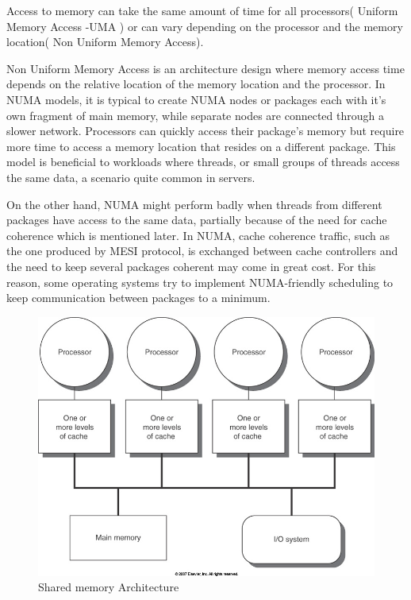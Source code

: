Access to memory can take the same amount of time for all processors( Uniform Memory Access -UMA ) or can vary depending on the processor and the memory location( Non Uniform Memory Access).

Non Uniform Memory Access is an architecture design where memory access time depends on the relative location of the memory location and the processor. In NUMA models, it is typical to create NUMA nodes or packages each with it's own fragment of main memory, while separate nodes are connected through a slower network.  Processors can quickly access their package's memory but require more time to access a memory location that resides on a different package. This model is beneficial to workloads where threads, or small groups of threads access the same data, a scenario quite common in servers.

On the other hand, NUMA might perform badly when threads from different packages have access to the same data, partially because of the need for cache coherence which is mentioned later. In NUMA, cache coherence traffic, such as the one produced by MESI protocol, is exchanged between cache controllers and the  need to keep several packages coherent may come in great cost. For this reason, some operating systems try to implement NUMA-friendly scheduling to keep communication between packages to a minimum.


\begin{figure}
 \centering
  \includegraphics[scale=0.4]{shared_memory.jpg}
\caption{Shared memory Architecture}
\label{Shared memory architecture}
\end{figure}


